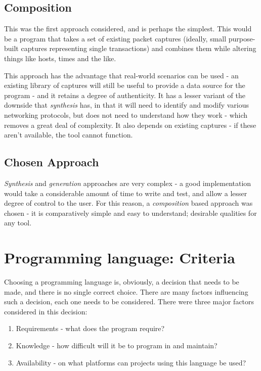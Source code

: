 \documentclass[10pt,a4paper,notitlepage]{report}
\begin{document}
\subsection{Composition}
This was the first approach considered, and is perhaps the simplest. This would be a program that takes a set of existing packet captures (ideally, small purpose-built captures representing single transactions) and combines them while altering things like hosts, times and the like.

This approach has the advantage that real-world scenarios can be used - an existing library of captures will still be useful to provide a data source for the program - and it retains a degree of authenticity. It has a lesser variant of the downside that \emph{synthesis} has, in that it will need to identify and modify various networking protocols, but does not need to understand how they work - which removes a great deal of complexity. It also depends on existing captures - if these aren't available, the tool cannot function.

\subsection{Chosen Approach}
\emph{Synthesis} and \emph{generation} approaches are very complex - a good implementation would take a considerable amount of time to write and test, and allow a lesser degree of control to the user. For this reason, a \emph{composition} based approach was chosen - it is comparatively simple and easy to understand; desirable qualities for any tool.

\section{Programming language: Criteria}
Choosing a programming language is, obviously, a decision that needs to be made, and there is no single correct choice. There are many factors influencing such a decision, each one needs to be considered. There were three major factors considered in this decision:
\begin{enumerate}[label=\roman*)]
\item Requirements - what does the program require?
\item Knowledge - how difficult will it be to program in and maintain?
\item Availability - on what platforms can projects using this language be used?
\end{enumerate}
\end{document}
